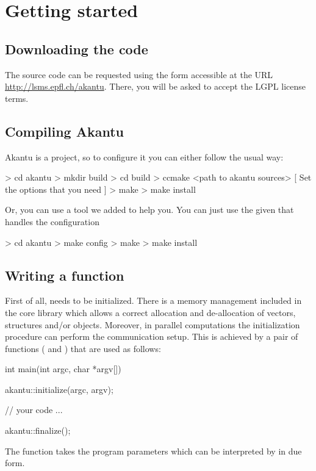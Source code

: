 \chapter{Getting started}
\section{Downloading the code}

The \akantu source code can be requested using the form accessible at the URL
\url{http://lsms.epfl.ch/akantu}.  There, you will be asked to accept the LGPL
license terms.

\section{Compiling Akantu}

Akantu is a  project, so to configure it you can either follow the usual way:
\begin{command}
  > cd akantu
  > mkdir build
  > cd build
  > ccmake <path to akantu sources>
  [ Set the options that you need ]
  > make
  > make install
\end{command}

Or, you can use a tool  we added to help you. You can just use the
given  that handles the  configuration

\begin{command}
  > cd akantu
  > make config
  > make
  > make install
\end{command}

\section{Writing a  function\label{sect:common:main}}

First of all, \akantu needs to be initialized.  There is a memory
management included in the core library which allows a correct
allocation and de-allocation of vectors, structures and/or
objects. Moreover, in parallel computations the initialization
procedure can perform the communication setup. This is achieved by
 a pair of functions ( and )
that are used as follows:
\begin{cpp}
int main(int argc, char *argv[])
{
  akantu::initialize(argc, argv);

  // your code
  ...

  akantu::finalize();
}
\end{cpp}
The  function takes the program parameters which
can be interpreted by \akantu in due form.

